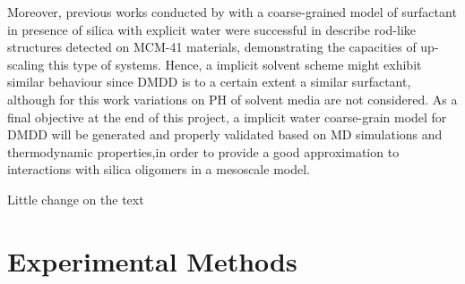 \documentclass[10pt,a4paper,twoside]{article}
\begin{document}
Moreover, previous works conducted by \cite{mjsilica} with a coarse-grained model of surfactant in presence of silica with explicit water were successful in describe rod-like structures detected on MCM-41 materials, demonstrating the capacities of up-scaling this type of systems. Hence, a implicit solvent scheme might exhibit similar behaviour since DMDD is to a certain extent a similar surfactant, although for this work variations on PH of solvent media are not considered. As a final objective at the end of this project, a implicit water coarse-grain model for DMDD will be generated and properly validated based on MD simulations and thermodynamic properties,in order to provide a good approximation to interactions with silica oligomers in a mesoscale model.



Little change on the text

\section{Experimental Methods}
\end{document}
